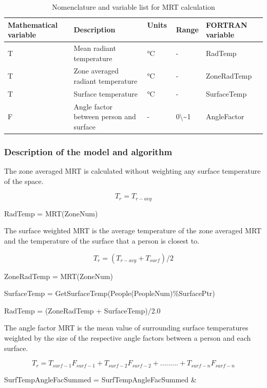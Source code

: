 \begin{longtable}[c]{p{1.2in}p{1.2in}p{1.2in}p{1.2in}p{1.2in}}
\caption{  Nomenclature and variable list for MRT calculation \protect \label{table:nomenclature-and-variable-list-for-mrt}}\\
\toprule 
Mathematical variable & Description & Units ~ & Range & FORTRAN variable \tabularnewline \midrule
\endhead
T & Mean radiant temperature & °C & - & RadTemp \tabularnewline
T & Zone averaged radiant temperature & °C & - & ZoneRadTemp \tabularnewline
T & Surface temperature & °C & - & SurfaceTemp \tabularnewline
F & Angle factor between person and surface & - & 0\textbackslash\~{}1 & AngleFactor \tabularnewline
\bottomrule
\end{longtable}

\subsubsection{Description of the model and algorithm}\label{description-of-the-model-and-algorithm-3}

The zone averaged MRT is calculated without weighting any surface temperature of the space.

\begin{equation}
{T_r} = {T_{r - avg}}
\end{equation}

RadTemp = MRT(ZoneNum)

The surface weighted MRT is the average temperature of the zone averaged MRT and the temperature of the surface that a person is closest to.

\begin{equation}
{T_r} = ({T_{r - avg}} + {T_{surf}})/2
\end{equation}

ZoneRadTemp = MRT(ZoneNum)

SurfaceTemp = GetSurfaceTemp(People(PeopleNum)\%SurfacePtr)

RadTemp = (ZoneRadTemp + SurfaceTemp)/2.0

The angle factor MRT is the mean value of surrounding surface temperatures weighted by the size of the respective angle factors between a person and each surface.

\begin{equation}
{T_r} = {T_{surf - 1}}{F_{surf - 1}} + {T_{surf - 2}}{F_{surf - 2}} + ......... + {T_{surf - n}}{F_{surf - n}}
\end{equation}

SurfTempAngleFacSummed = SurfTempAngleFacSummed \&

